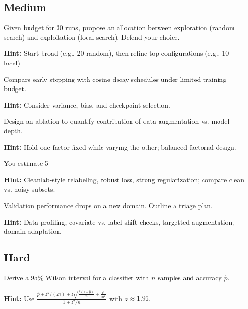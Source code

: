 \subsection*{Medium}

\begin{problem}
Given budget for 30 runs, propose an allocation between exploration (random search) and exploitation (local search). Defend your choice.

\textbf{Hint:} Start broad (e.g., 20 random), then refine top configurations (e.g., 10 local).
\end{problem}

\begin{problem}
Compare early stopping with cosine decay schedules under limited training budget.

\textbf{Hint:} Consider variance, bias, and checkpoint selection.
\end{problem}

\begin{problem}
Design an ablation to quantify contribution of data augmentation vs. model depth.

\textbf{Hint:} Hold one factor fixed while varying the other; balanced factorial design.
\end{problem}

\begin{problem}
You estimate 5%

\textbf{Hint:} Cleanlab-style relabeling, robust loss, strong regularization; compare clean vs. noisy subsets.
\end{problem}

\begin{problem}
Validation performance drops on a new domain. Outline a triage plan.

\textbf{Hint:} Data profiling, covariate vs. label shift checks, targetted augmentation, domain adaptation.
\end{problem}

\subsection*{Hard}

\begin{problem}
Derive a 95\% Wilson interval for a classifier with $n$ samples and accuracy $\hat{p}$.

\textbf{Hint:} Use $\frac{\hat{p}+z^2/(2n) \pm z\sqrt{\frac{\hat{p}(1-\hat{p})}{n}+\frac{z^2}{4n^2}}}{1+z^2/n}$ with $z\approx1.96$.
\end{problem}

